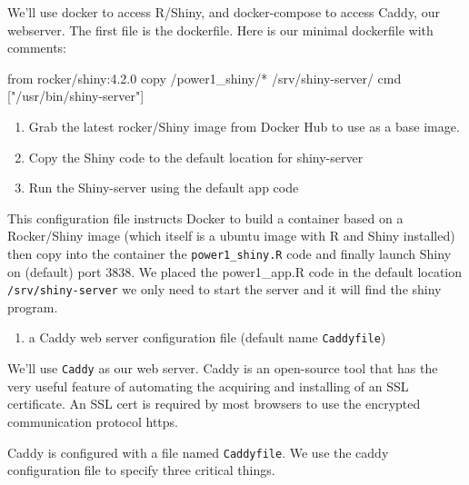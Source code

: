 \documentclass[
  letterpaper,
  DIV=11,
  numbers=noendperiod,
  oneside]{scrartcl}
\newenvironment{Shaded}{\begin{snugshade}}{\end{snugshade}}
\newcommand{\DecValTok}[1]{\textcolor[rgb]{0.68,0.00,0.00}{#1}}
\newcommand{\ErrorTok}[1]{\textcolor[rgb]{0.68,0.00,0.00}{#1}}
\newcommand{\FloatTok}[1]{\textcolor[rgb]{0.68,0.00,0.00}{#1}}
\newcommand{\NormalTok}[1]{\textcolor[rgb]{0.00,0.23,0.31}{#1}}
\newcommand{\SpecialCharTok}[1]{\textcolor[rgb]{0.37,0.37,0.37}{#1}}
\newcommand{\StringTok}[1]{\textcolor[rgb]{0.13,0.47,0.30}{#1}}
\providecommand{\tightlist}{%
  \setlength{\itemsep}{0pt}\setlength{\parskip}{0pt}}\usepackage{longtable,booktabs,array}
\begin{document}
We'll use docker to access R/Shiny, and docker-compose to access Caddy,
our webserver. The first file is the dockerfile. Here is our minimal
dockerfile with comments:

\begin{Shaded}
\begin{Highlighting}[]
\NormalTok{from rocker}\SpecialCharTok{/}\NormalTok{shiny}\SpecialCharTok{:}\DecValTok{4}\NormalTok{.}\FloatTok{2.0}
\NormalTok{copy }\SpecialCharTok{/}\NormalTok{power1\_shiny}\SpecialCharTok{/}\ErrorTok{*} \ErrorTok{/}\NormalTok{srv}\SpecialCharTok{/}\NormalTok{shiny}\SpecialCharTok{{-}}\NormalTok{server}\SpecialCharTok{/}
\NormalTok{cmd [}\StringTok{"/usr/bin/shiny{-}server"}\NormalTok{]}
\end{Highlighting}
\end{Shaded}

\begin{enumerate}
\def\labelenumi{\arabic{enumi}.}
\tightlist
\item
  Grab the latest rocker/Shiny image from Docker Hub to use as a base
  image.
\item
  Copy the Shiny code to the default location for shiny-server
\item
  Run the Shiny-server using the default app code
\end{enumerate}

This configuration file instructs Docker to build a container based on a
Rocker/Shiny image (which itself is a ubuntu image with R and Shiny
installed) then copy into the container the \texttt{power1\_shiny.R}
code and finally launch Shiny on (default) port 3838. We placed the
power1\_app.R code in the default location \texttt{/srv/shiny-server} we
only need to start the server and it will find the shiny program.

\begin{enumerate}
\def\labelenumi{\arabic{enumi}.}
\setcounter{enumi}{1}
\tightlist
\item
  a Caddy web server configuration file (default name
  \texttt{Caddyfile})
\end{enumerate}

We'll use \texttt{Caddy} as our web server. Caddy is an open-source tool
that has the very useful feature of automating the acquiring and
installing of an SSL certificate. An SSL cert is required by most
browsers to use the encrypted communication protocol https.

Caddy is configured with a file named \texttt{Caddyfile}. We use the
caddy configuration file to specify three critical things.
\end{document}
